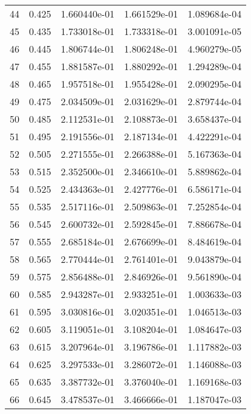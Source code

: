 \begin{table}[ht]
\begin{tabular}{rcccc}
    44 &  0.425 &    1.660440e-01 &    1.661529e-01  &     1.089684e-04\\ 
    45 &  0.435 &    1.733018e-01 &    1.733318e-01  &     3.001091e-05\\ 
    46 &  0.445 &    1.806744e-01 &    1.806248e-01  &     4.960279e-05\\ 
    47 &  0.455 &    1.881587e-01 &    1.880292e-01  &     1.294289e-04\\ 
    48 &  0.465 &    1.957518e-01 &    1.955428e-01  &     2.090295e-04\\ 
    49 &  0.475 &    2.034509e-01 &    2.031629e-01  &     2.879744e-04\\ 
    50 &  0.485 &    2.112531e-01 &    2.108873e-01  &     3.658437e-04\\ 
    51 &  0.495 &    2.191556e-01 &    2.187134e-01  &     4.422291e-04\\ 
    52 &  0.505 &    2.271555e-01 &    2.266388e-01  &     5.167363e-04\\ 
    53 &  0.515 &    2.352500e-01 &    2.346610e-01  &     5.889862e-04\\ 
    54 &  0.525 &    2.434363e-01 &    2.427776e-01  &     6.586171e-04\\ 
    55 &  0.535 &    2.517116e-01 &    2.509863e-01  &     7.252854e-04\\ 
    56 &  0.545 &    2.600732e-01 &    2.592845e-01  &     7.886678e-04\\ 
    57 &  0.555 &    2.685184e-01 &    2.676699e-01  &     8.484619e-04\\ 
    58 &  0.565 &    2.770444e-01 &    2.761401e-01  &     9.043879e-04\\ 
    59 &  0.575 &    2.856488e-01 &    2.846926e-01  &     9.561890e-04\\ 
    60 &  0.585 &    2.943287e-01 &    2.933251e-01  &     1.003633e-03\\ 
    61 &  0.595 &    3.030816e-01 &    3.020351e-01  &     1.046513e-03\\ 
    62 &  0.605 &    3.119051e-01 &    3.108204e-01  &     1.084647e-03\\ 
    63 &  0.615 &    3.207964e-01 &    3.196786e-01  &     1.117882e-03\\ 
    64 &  0.625 &    3.297533e-01 &    3.286072e-01  &     1.146088e-03\\ 
    65 &  0.635 &    3.387732e-01 &    3.376040e-01  &     1.169168e-03\\ 
    66 &  0.645 &    3.478537e-01 &    3.466666e-01  &     1.187047e-03\\ 

\end{tabular}
\end{table}
